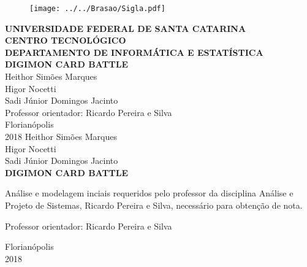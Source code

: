 \documentclass[12pt,a4paper,brazil,abntex2]{article}
\begin{document}
\singlespacing
\begin{titlepage}
\begin{center}
\begin{figure}[!htb]
\center

\texttt{[image: ../../Brasao/Sigla.pdf]} 

\end{figure}
{\bf  UNIVERSIDADE FEDERAL DE SANTA CATARINA}\\[0.2cm] %
{\bf CENTRO TECNOLÓGICO}\\[0.2cm] %
{\bf  DEPARTAMENTO DE INFORMÁTICA E ESTATÍSTICA}\\[5.5cm]
{\bf \large DIGIMON CARD BATTLE}\\[4.1cm] %
{Heithor Simões Marques}\\
{Higor Nocetti}\\
{Sadi Júnior Domingos Jacinto}\\[0.7cm] %
{Professor orientador: Ricardo Pereira e Silva}\\[4.1 cm]
{Florianópolis}\\[0.2cm]
{2018}
\newpage
\thispagestyle{empty}
{Heithor Simões Marques}\\
{Higor Nocetti}\\
{Sadi Júnior Domingos Jacinto}\\[10cm] %
{\bf \large DIGIMON CARD BATTLE}\\[0.5cm]
    \begin{flushright}
    \begin{list}{}{
      \setlength{\leftmargin}{7.2cm}
      \setlength{\rightmargin}{0cm}
      \setlength{\labelwidth}{0pt}
      \setlength{\labelsep}{\leftmargin}}
      \item Análise e modelagem inciais requeridos pelo professor da disciplina Análise e Projeto de Sistemas, Ricardo Pereira e Silva, necessário para obtenção de nota.\\[0.2 cm] 
      \setlength{\labelsep}{\leftmargin}
      \item Professor orientador: Ricardo Pereira e Silva\
      \\[8.2cm]
     \end{list}
	 \end{flushright}
{Florianópolis}\\[0.2cm]
{2018}
\end{center}
\end{titlepage} %
\end{document}
